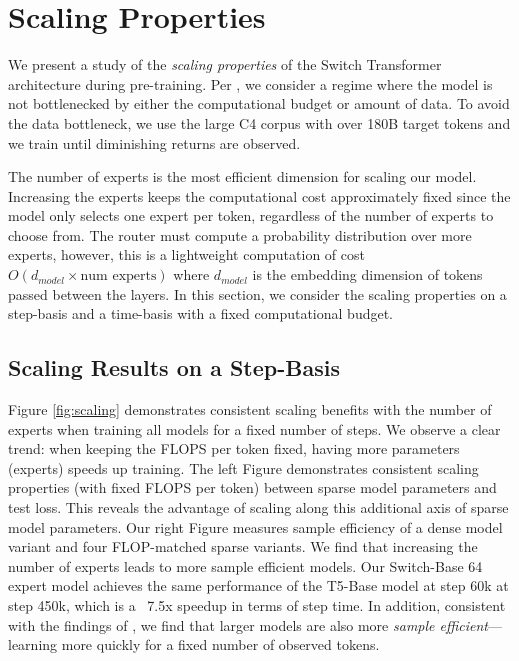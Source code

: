 \documentclass[twoside,11pt]{article}
\begin{document}
\section{Scaling Properties}\label{sec: scaling}
We present a study of the \emph{scaling properties} of the Switch Transformer architecture during pre-training.
Per \citet{kaplan2020scaling}, we consider a regime where the model is not bottlenecked by either the computational budget or amount of data.
To avoid the data bottleneck, we use the large C4 corpus with over 180B target tokens \citep{raffel2019exploring} and we train until diminishing returns are observed.

The number of experts is the most efficient dimension for scaling our model.
Increasing the experts keeps the computational cost approximately fixed since the model only selects one expert per token, regardless of the number of experts to choose from.
The router must compute a probability distribution over more experts, however, this is a lightweight computation of cost $O(d_{model} \times \text{num experts})$ where $d_{model}$ is the embedding dimension of tokens passed between the layers.
In this section, we consider the scaling properties on a step-basis and a time-basis with a fixed computational budget.

\subsection{Scaling Results on a Step-Basis}
Figure \ref{fig:scaling} demonstrates consistent scaling benefits with the number of experts when training all models for a fixed number of steps.
We observe a clear trend: when keeping the FLOPS per token fixed, having more parameters (experts) speeds up training.
The left Figure demonstrates consistent scaling properties (with fixed FLOPS per token) between sparse model parameters and test loss.
This reveals the advantage of scaling along this additional axis of sparse model parameters.
Our right Figure measures sample efficiency of a dense model variant and four FLOP-matched sparse variants.
We find that increasing the number of experts leads to more sample efficient models.
Our Switch-Base 64 expert model achieves the same performance of the T5-Base model at step 60k at step 450k, which is a ~7.5x speedup in terms of step time.
In addition, consistent with the findings of \citet{kaplan2020scaling}, we find that larger models are also more \emph{sample efficient}---learning more quickly for a fixed number of observed tokens.
\end{document}

